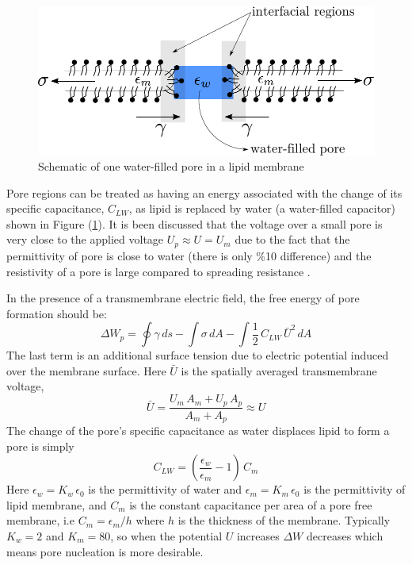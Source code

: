 \documentclass[english,12pt]{article}
\begin{document}
\begin{figure}[H]
	\centering
	\includegraphics[scale=0.8]{pics/pore1_1.pdf}
	\caption{Schematic of one water-filled pore in a lipid membrane}
	\label{fig:pore1}
\end{figure}
Pore regions can be treated as having an energy associated with the change of its specific capacitance, $C_{LW}$, as lipid is replaced by water (a water-filled capacitor) shown in Figure (\ref{fig:pore1}). It is been discussed that the voltage over a small pore is very close to the applied voltage $U_{p}\approx U=U_m$ due to the fact that the permittivity of pore is close to water (there is only \%10 difference) and the resistivity of a pore is large compared to spreading resistance \cite{Weaver1996135}. 

In the presence of a transmembrane electric field, the free energy of pore formation should be:
\begin{equation}
\Delta W_{p} = \oint\gamma\,ds - \int\sigma\,dA-\int\frac{1}{2}\,C_{LW}\,\bar{U}^{2}\,dA 
\label{eqn:poreenergy}
\end{equation}
The last term is an additional surface tension due to electric potential induced over the membrane surface. Here $\bar{U}$ is the spatially averaged transmembrane voltage, 
\begin{equation}
\bar{U}=\frac{U_m\,A_m+U_p\,A_p}{A_m+A_p}\approx U
\end{equation}
The change of the pore's specific capacitance as water displaces lipid to form a pore is simply 
\begin{equation}
C_{LW}=\left(\frac{\epsilon_w}{\epsilon_m}-1\right)\,C_m
\end{equation}
Here $\epsilon_w=K_w\,\epsilon_0$ is the permittivity of water and $\epsilon_m=K_m\,\epsilon_0$ is the permittivity of lipid membrane, and $C_m$ is the constant capacitance per area of a pore free membrane, i.e $C_m=\epsilon_m/h$ where $h$ is the thickness of the membrane. Typically $K_w=2$ and $K_m=80$, so when the potential $U$ increases $\Delta W$ decreases which means pore nucleation is more desirable.
\end{document}
